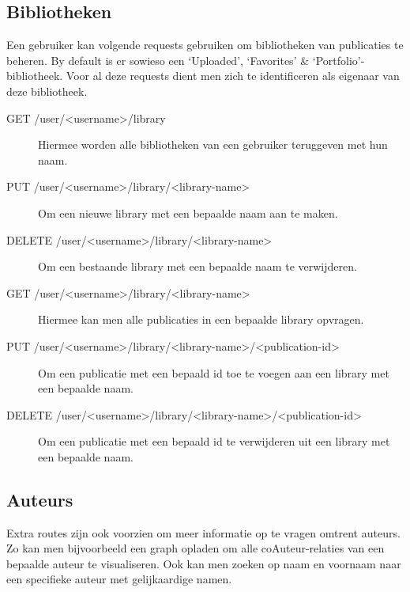 \documentclass{article}
\begin{document}
\subsection{Bibliotheken}

Een gebruiker kan volgende requests gebruiken om bibliotheken van publicaties te beheren. By default is er sowieso een `Uploaded', `Favorites' \& `Portfolio'-bibliotheek. Voor al deze requests dient men zich te identificeren als eigenaar van deze bibliotheek.

\begin{description}

\item[GET /user/<username>/library] Hiermee worden alle bibliotheken van een gebruiker teruggeven met hun naam.

\item[PUT /user/<username>/library/<library-name>] Om een nieuwe library met een bepaalde naam aan te maken.

\item[DELETE /user/<username>/library/<library-name>] Om een bestaande library met een bepaalde naam te verwijderen.

\item[GET /user/<username>/library/<library-name>] Hiermee kan men alle publicaties in een bepaalde library opvragen.

\item[PUT /user/<username>/library/<library-name>/<publication-id>] Om een publicatie met een bepaald id toe te voegen aan een library met een bepaalde naam.

\item[DELETE /user/<username>/library/<library-name>/<publication-id>] Om een publicatie met een bepaald id te verwijderen uit een library met een bepaalde naam.

\end{description}

\subsection{Auteurs}

Extra routes zijn ook voorzien om meer informatie op te vragen omtrent auteurs. Zo kan men bijvoorbeeld een graph opladen om alle coAuteur-relaties van een bepaalde auteur te visualiseren. Ook kan men zoeken op naam en voornaam naar een specifieke auteur met gelijkaardige namen.
\end{document}
